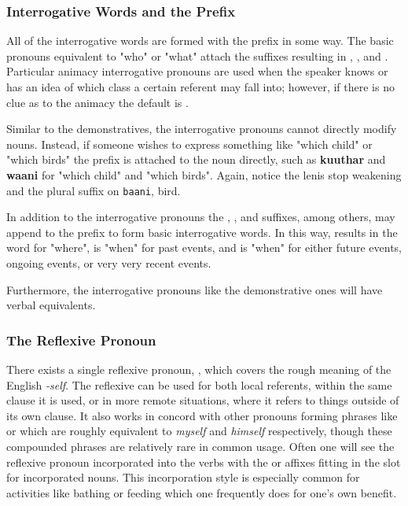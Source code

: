     \subsubsection{Interrogative Words and the \prefixtext{\interrogative} Prefix}
    All of the interrogative words are formed with the \prefixtext{\interrogative} prefix in some way. The basic pronouns equivalent to "who" or "what" attach the suffixes resulting in \textbf{\interrogative\agtsuffix}, \textbf{\interrogative\animsuffix}, and \textbf{\interrogative\inansuffix}. Particular animacy interrogative pronouns are used when the speaker knows or has an idea of which class a certain referent may fall into; however, if there is no clue as to the animacy the default is \textbf{\interrogative\agtsuffix}.
    \par
    Similar to the demonstratives, the interrogative pronouns cannot directly modify nouns. Instead, if someone wishes to express something like "which child" or "which birds" the \prefixtext{\interrogative} prefix is attached to the noun directly, such as \textbf{\interrogative kuuthar} and \textbf{\interrogative waani\animvowelplural} for "which child" and "which birds". Again, notice the lenis stop weakening and the plural suffix on \texttt{baani}, bird.
    \par
    In addition to the interrogative pronouns the \suffixtext{\pastsuffix}, \suffixtext{\nonpastsuffix}, and \suffixtext{\locationsuffix} suffixes, among others, may append to the \prefixtext{\interrogative} prefix to form basic interrogative words. In this way, \textbf{\interrogative\locationsuffix} results in the word for "where", \textbf{\interrogative\pastsuffix} is "when" for past events, and \textbf{\interrogative\nonpastsuffix} is "when" for either future events, ongoing events, or very very recent events.
    \par
    Furthermore, the interrogative pronouns like the demonstrative ones will have verbal equivalents.
    \vertspace

    \subsubsection{The Reflexive Pronoun \textbf{}}
    There exists a single reflexive pronoun, \textbf{}, which covers the rough meaning of the English \textit{-self}. The reflexive can be used for both local referents, within the same clause it is used, or in more remote situations, where it refers to things outside of its own clause. It also works in concord with other pronouns forming phrases like \textbf{\firstpn\space{}} or \textbf{\proximal\agtsuffix\space{}} which are roughly equivalent to \textit{myself} and \textit{himself} respectively, though these compounded phrases are relatively rare in common usage. Often one will see the reflexive pronoun incorporated into the verbs with the  or  affixes fitting in the slot for incorporated nouns. This incorporation style is especially common for activities like bathing or feeding which one frequently does for one's own benefit.
    \vertspace

